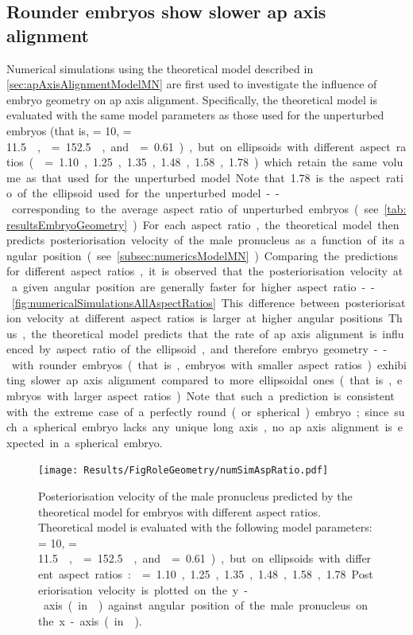 \subsection{Rounder embryos show slower \acs{ap} axis alignment}\label{subsec:roundEmbryosIma3}
Numerical simulations using the theoretical model described in \autoref{sec:apAxisAlignmentModelMN} are first used to investigate the influence of embryo geometry on \ac{ap} axis alignment. Specifically, the theoretical model is evaluated with the same model parameters as those used for the unperturbed embryos (that is, \hydrodynamicLength = \SI{10}{\unitLength}, \activeRelaxLength = \SI{11.5}{\square\unitLength\per\second}, \nematicLength = \SI{152.5}{\square\unitLength\per\second}, and \dragCoefficient = \num{0.61}), but on ellipsoids with different aspect ratios (\aspectRatio = \num{1.10}, \num{1.25}, \num{1.35}, \num{1.48}, \num{1.58}, \num{1.78}) which retain the same volume as that used for the unperturbed model. Note that \num{1.78} is the aspect ratio of the ellipsoid used for the unperturbed model -- corresponding to the average aspect ratio of unperturbed embryos (see \autoref{tab:resultsEmbryoGeometry}). For each aspect ratio, the theoretical model then predicts posteriorisation velocity of the male pronucleus as a function of its angular position (see \autoref{subsec:numericsModelMN}). Comparing the predictions for different aspect ratios, it is observed that the posteriorisation velocity at a given angular position are generally faster for higher aspect ratio -- \autoref{fig:numericalSimulationsAllAspectRatios}. This difference between posteriorisation velocity at different aspect ratios is larger at higher angular positions. Thus, the theoretical model predicts that the rate of \ac{ap} axis alignment is influenced by aspect ratio of the ellipsoid, and therefore embryo geometry -- with rounder embryos (that is, embryos with smaller aspect ratios) exhibiting slower \ac{ap} axis alignment compared to more ellipsoidal ones (that is, embryos with larger aspect ratios). Note that such a prediction is consistent with the extreme case of a perfectly round (or spherical) embryo; since such a spherical embryo lacks any unique long axis, no \ac{ap} axis alignment is expected in a spherical embryo.

\begin{figure}
\centering
\texttt{[image: Results/FigRoleGeometry/numSimAspRatio.pdf]}
\caption[Theoretical model predicts slower posteriorisation for rounder embryos]{Posteriorisation velocity of the male pronucleus predicted by the theoretical model for embryos with different aspect ratios. Theoretical model is evaluated with the following model parameters: \hydrodynamicLength = \SI{10}{\unitLength}, \activeRelaxLength = \SI{11.5}{\square\unitLength\per\second}, \nematicLength = \SI{152.5}{\square\unitLength\per\second}, and \dragCoefficient = \num{0.61}), but on ellipsoids with different aspect ratios: \aspectRatio = \num{1.10}, \num{1.25}, \num{1.35}, \num{1.48}, \num{1.58}, \num{1.78}. Posteriorisation velocity is plotted on the y-axis (in \si{\unitPostVel}) against angular position of the male pronucleus on the x-axis (in \si{\unitAngle}).}
\label{fig:numericalSimulationsAllAspectRatios}
\end{figure}

